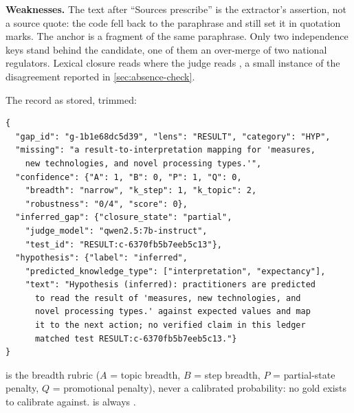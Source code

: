 \textbf{Weaknesses.} The text after \enquote{Sources prescribe} is the extractor's assertion, not a
source quote: the code fell back to the paraphrase and still set it in quotation marks. The anchor
is a fragment of the same paraphrase. Only two independence keys stand behind the candidate, one of
them an over-merge of two national regulators. Lexical closure reads  where the judge
reads , a small instance of the disagreement reported in \cref{sec:absence-check}.

The record as stored, trimmed:

{\small
\begin{verbatim}
{
  "gap_id": "g-1b1e68dc5d39", "lens": "RESULT", "category": "HYP",
  "missing": "a result-to-interpretation mapping for 'measures,
    new technologies, and novel processing types.'",
  "confidence": {"A": 1, "B": 0, "P": 1, "Q": 0,
    "breadth": "narrow", "k_step": 1, "k_topic": 2,
    "robustness": "0/4", "score": 0},
  "inferred_gap": {"closure_state": "partial",
    "judge_model": "qwen2.5:7b-instruct",
    "test_id": "RESULT:c-6370fb5b7eeb5c13"},
  "hypothesis": {"label": "inferred",
    "predicted_knowledge_type": ["interpretation", "expectancy"],
    "text": "Hypothesis (inferred): practitioners are predicted
      to read the result of 'measures, new technologies, and
      novel processing types.' against expected values and map
      it to the next action; no verified claim in this ledger
      matched test RESULT:c-6370fb5b7eeb5c13."}
}
\end{verbatim}
}

 is the breadth rubric ($A$ = topic breadth, $B$ = step breadth, $P$ =
partial-state penalty, $Q$ = promotional penalty), never a calibrated probability: no gold exists to
calibrate against.  is always .
